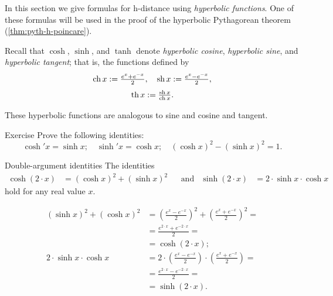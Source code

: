 In this section we give formulas for h-distance using \emph{hyperbolic functions}.
One of these formulas will be used in the proof of the hyperbolic Pythagorean theorem (\ref{thm:pyth-h-poincare}).

Recall that $\cosh$, $\sinh$, and $\tanh$ denote \emph{hyperbolic cosine}, \emph{hyperbolic sine}, and \emph{hyperbolic tangent}\label{hyperbolic tangent};
that is, the functions defined by
\[\operatorname{ch} x:= \tfrac{e^x+e^{-x}}2,
 \quad
 \operatorname{sh} x:= \tfrac{e^x-e^{-x}}2,
\]
\[\operatorname{th} x:= \tfrac{\operatorname{sh} x}{\operatorname{ch} x}.
\]

These hyperbolic functions are analogous to sine and cosine and tangent. 

\begin{thm}{Exercise}\label{ex:hyp-fun}
Prove the following identities:
\[\cosh' x=\sinh x;\quad \sinh'x=\cosh x;\quad (\cosh x)^2-(\sinh x)^2=1.\]
\end{thm}

\begin{thm}{Double-argument identities}\label{double-argument}
The identities
\begin{align*}
\cosh (2\cdot x)&=(\cosh x)^2+(\sinh x)^2 
&&\text{and}&
\sinh (2\cdot x)&=2\cdot\sinh x\cdot \cosh x
\end{align*}
hold for any real value $x$.
\end{thm}

\begin{align*}
(\sinh x)^2+(\cosh x)^2
&=(\tfrac{e^x-e^{-x}}2)^2+(\tfrac{e^x+e^{-x}}2)^2=
\\
&=\tfrac{e^{2\cdot x}+e^{-2\cdot x}}2=
\\
&=\cosh (2\cdot x);
\\
2\cdot\sinh x\cdot \cosh x
&=2\cdot(\tfrac{e^x-e^{-x}}2)\cdot(\tfrac{e^x+e^{-x}}2)=
\\
&=\tfrac{e^{2\cdot x}-e^{-2\cdot x}}2=
\\
&=\sinh (2\cdot x).
\end{align*}
\qedsf

